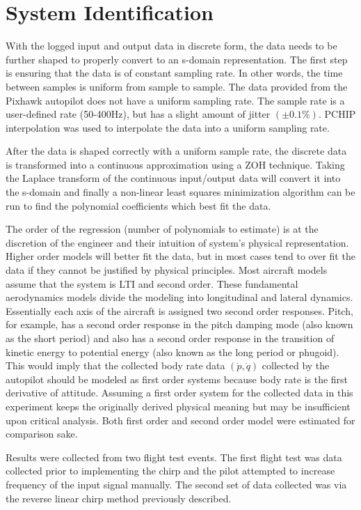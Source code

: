 \label{appendix:system_identification}
\section{System Identification}

With the logged input and output data in discrete form, the data needs to be further shaped to properly convert to an s-domain representation.  The first step is ensuring that the data is of constant sampling rate.  In other words, the time between samples is uniform from sample to sample.  The data provided from the Pixhawk autopilot does not have a uniform sampling rate.  The sample rate is a user-defined rate (50-400Hz), but has a slight amount of jitter $(\pm 0.1\%)$.  \ac{PCHIP} interpolation was used to interpolate the data into a uniform sampling rate.

After the data is shaped correctly with a uniform sample rate, the discrete data is transformed into a continuous approximation using a \ac{ZOH} technique.  Taking the Laplace transform of the continuous input/output data will convert it into the s-domain and finally a non-linear least squares minimization algorithm can be run to find the polynomial coefficients which best fit the data.

The order of the regression (number of polynomials to estimate) is at the discretion of the engineer and their intuition of system's physical representation.  Higher order models will better fit the data, but in most cases tend to over fit the data if they cannot be justified by physical principles.  Most aircraft models assume that the system is \ac{LTI} and second order.  These fundamental aerodynamics models divide the modeling into longitudinal and lateral dynamics.  Essentially each axis of the aircraft is assigned two second order responses.  Pitch, for example, has a second order response in the pitch damping mode (also known as the short period) and also has a second order response in the transition of kinetic energy to potential energy (also known as the long period or phugoid).  This would imply that the collected body rate data $(\dot{p},\dot{q})$ collected by the autopilot should be modeled as first order systems because body rate is the first derivative of attitude.  Assuming a first order system for the collected data in this experiment keeps the originally derived physical meaning but may be insufficient upon critical analysis.  Both first order and second order model were estimated for comparison sake.

Results were collected from two flight test events.  The first flight test was data collected prior to implementing the chirp and the pilot attempted to increase frequency of the input signal manually.  The second set of data collected was via the reverse linear chirp method previously described.  


